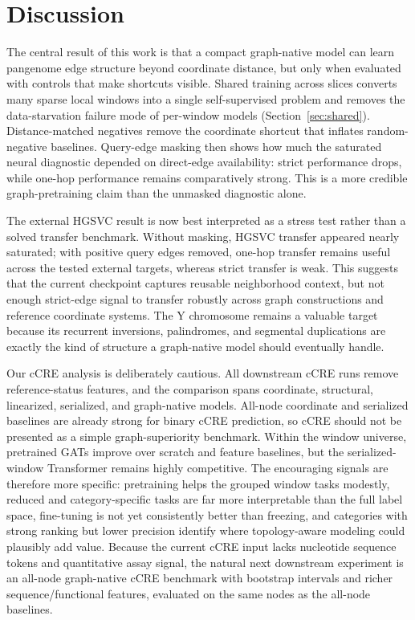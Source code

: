 \IfFileExists{ws-procs11x85.cls}{\worldscientificclasstrue\documentclass{ws-procs11x85}}{\worldscientificclassfalse\documentclass[11pt]{article}\usepackage[margin=1in]{geometry}}
\begin{document}
\FloatBarrier

\section{Discussion}

The central result of this work is that a compact graph-native model can learn
pangenome edge structure beyond coordinate distance, but only when evaluated
with controls that make shortcuts visible. Shared training across slices
converts many sparse local windows into a single self-supervised problem and
removes the data-starvation failure mode of per-window models
(Section~\ref{sec:shared}). Distance-matched negatives remove the coordinate
shortcut that inflates random-negative baselines. Query-edge masking then shows
how much the saturated neural diagnostic depended on direct-edge availability:
strict performance drops, while one-hop performance remains comparatively
strong. This is a more credible graph-pretraining claim than the unmasked
diagnostic alone.

The external HGSVC result is now best interpreted as a stress test rather than a
solved transfer benchmark. Without masking, HGSVC transfer appeared nearly
saturated; with positive query edges removed, one-hop transfer remains useful
across the tested external targets, whereas strict transfer is weak. This
suggests that the current checkpoint captures reusable neighborhood context, but
not enough strict-edge signal to transfer robustly across graph constructions and
reference coordinate systems. The Y chromosome remains a valuable target because
its recurrent inversions, palindromes, and segmental duplications are exactly the
kind of structure a graph-native model should eventually handle.\cite{hallast2023ychrom}

Our cCRE analysis is deliberately cautious. All downstream cCRE runs remove
reference-status features, and the comparison spans coordinate, structural,
linearized, serialized, and graph-native models. All-node coordinate and
serialized baselines are already strong for binary cCRE prediction, so cCRE
should not be presented as a simple graph-superiority benchmark. Within the
window universe, pretrained GATs improve over scratch and feature baselines, but
the serialized-window Transformer remains highly competitive. The encouraging
signals are therefore more specific: pretraining helps the grouped window tasks
modestly, reduced and category-specific tasks are far more interpretable than
the full label space, fine-tuning is not yet consistently better than freezing,
and categories with strong ranking but lower precision identify where
topology-aware modeling could plausibly add value. Because the current cCRE
input lacks nucleotide sequence tokens and quantitative assay signal, the
natural next downstream experiment is an all-node graph-native cCRE benchmark
with bootstrap intervals and richer sequence/functional features, evaluated on
the same nodes as the all-node baselines.
\end{document}
